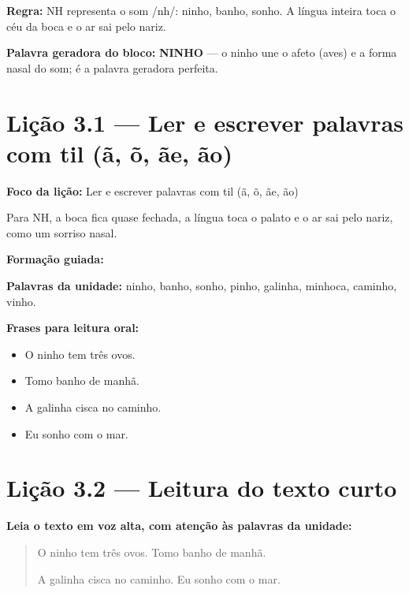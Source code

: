 \textbf{Regra:} NH representa o som /nh/: ninho, banho, sonho. A língua inteira toca o céu da boca e o ar sai pelo nariz.

\textbf{Palavra geradora do bloco:} \textbf{NINHO} --- o ninho une o afeto (aves) e a forma nasal do som; é a palavra geradora perfeita.

\section{Lição 3.1 --- Ler e escrever palavras com til (ã, õ, ãe, ão)}

\textbf{Foco da lição:} Ler e escrever palavras com til (ã, õ, ãe, ão)


\begin{boquinha}
Para NH, a boca fica quase fechada, a língua toca o palato e o ar sai pelo nariz, como um sorriso nasal.
\end{boquinha}

\noindent\textbf{Formação guiada:}

\begin{center}
\end{center}

\noindent\textbf{Palavras da unidade:} ninho, banho, sonho, pinho, galinha, minhoca, caminho, vinho.

\noindent\textbf{Frases para leitura oral:}
\begin{itemize}[leftmargin=1.6em]
  \item O ninho tem três ovos.
  \item Tomo banho de manhã.
  \item A galinha cisca no caminho.
  \item Eu sonho com o mar.
\end{itemize}

\section{Lição 3.2 --- Leitura do texto curto}

\noindent\textbf{Leia o texto em voz alta, com atenção às palavras da unidade:}


\begin{quote}
O ninho tem três ovos. Tomo banho de manhã.

A galinha cisca no caminho. Eu sonho com o mar.
\end{quote}

